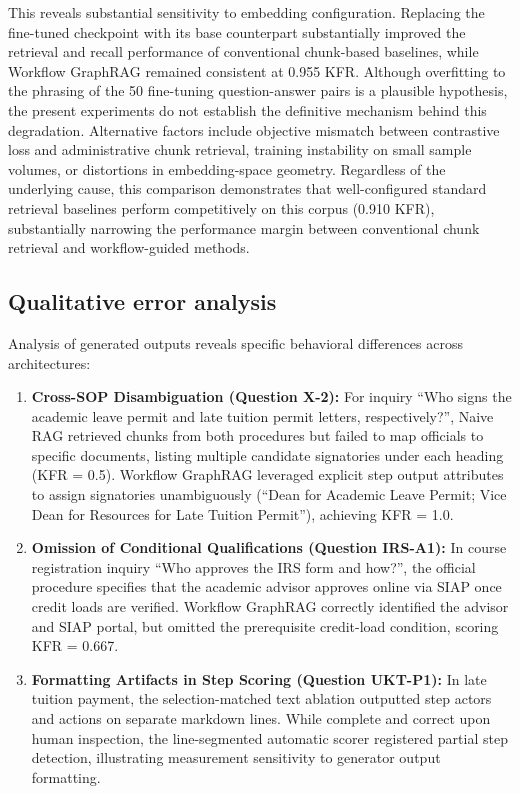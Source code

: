\documentclass[preprint,10pt]{elsarticle}
\begin{document}
This reveals substantial sensitivity to embedding configuration. Replacing the fine-tuned checkpoint with its base counterpart substantially improved the retrieval and recall performance of conventional chunk-based baselines, while Workflow GraphRAG remained consistent at 0.955 KFR. Although overfitting to the phrasing of the 50 fine-tuning question-answer pairs is a plausible hypothesis, the present experiments do not establish the definitive mechanism behind this degradation. Alternative factors include objective mismatch between contrastive loss and administrative chunk retrieval, training instability on small sample volumes, or distortions in embedding-space geometry. Regardless of the underlying cause, this comparison demonstrates that well-configured standard retrieval baselines perform competitively on this corpus (0.910 KFR), substantially narrowing the performance margin between conventional chunk retrieval and workflow-guided methods.

\subsection{Qualitative error analysis}
Analysis of generated outputs reveals specific behavioral differences across architectures:
\begin{enumerate}[leftmargin=*]
\item \textbf{Cross-SOP Disambiguation (Question X-2):} For inquiry ``Who signs the academic leave permit and late tuition permit letters, respectively?'', Naive RAG retrieved chunks from both procedures but failed to map officials to specific documents, listing multiple candidate signatories under each heading (KFR = 0.5). Workflow GraphRAG leveraged explicit step output attributes to assign signatories unambiguously (``Dean for Academic Leave Permit; Vice Dean for Resources for Late Tuition Permit''), achieving KFR = 1.0.
\item \textbf{Omission of Conditional Qualifications (Question IRS-A1):} In course registration inquiry ``Who approves the IRS form and how?'', the official procedure specifies that the academic advisor approves online via SIAP once credit loads are verified. Workflow GraphRAG correctly identified the advisor and SIAP portal, but omitted the prerequisite credit-load condition, scoring KFR = 0.667.
\item \textbf{Formatting Artifacts in Step Scoring (Question UKT-P1):} In late tuition payment, the selection-matched text ablation outputted step actors and actions on separate markdown lines. While complete and correct upon human inspection, the line-segmented automatic scorer registered partial step detection, illustrating measurement sensitivity to generator output formatting.
\end{enumerate}
\end{document}
